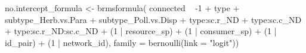 \documentclass[11pt,]{article}
\newenvironment{Shaded}{}{}
\newcommand{\KeywordTok}[1]{\textcolor[rgb]{0.00,0.00,1.00}{#1}}
\newcommand{\DataTypeTok}[1]{#1}
\newcommand{\DecValTok}[1]{#1}
\newcommand{\StringTok}[1]{\textcolor[rgb]{0.00,0.50,0.50}{#1}}
\newcommand{\OperatorTok}[1]{#1}
\newcommand{\NormalTok}[1]{#1}
\begin{document}
\begin{Shaded}
\begin{Highlighting}[]
\NormalTok{no.intercept_formula <-}\StringTok{ }\KeywordTok{brmsformula}\NormalTok{(}
\NormalTok{  connected }\OperatorTok{~}\StringTok{ }\OperatorTok{-}\DecValTok{1} \OperatorTok{+}\StringTok{ }\NormalTok{type }\OperatorTok{+}\StringTok{ }\NormalTok{subtype_Herb.vs.Para }\OperatorTok{+}\StringTok{ }\NormalTok{subtype_Poll.vs.Disp }\OperatorTok{+}\StringTok{ }
\StringTok{    }\NormalTok{type}\OperatorTok{:}\NormalTok{sc.r_ND }\OperatorTok{+}\StringTok{ }\NormalTok{type}\OperatorTok{:}\NormalTok{sc.c_ND }\OperatorTok{+}\StringTok{ }
\StringTok{    }\NormalTok{type}\OperatorTok{:}\NormalTok{sc.r_ND}\OperatorTok{:}\NormalTok{sc.c_ND }\OperatorTok{+}
\StringTok{    }\NormalTok{(}\DecValTok{1} \OperatorTok{|}\StringTok{ }\NormalTok{resource_sp) }\OperatorTok{+}\StringTok{ }\NormalTok{(}\DecValTok{1} \OperatorTok{|}\StringTok{ }\NormalTok{consumer_sp) }\OperatorTok{+}\StringTok{ }\NormalTok{(}\DecValTok{1} \OperatorTok{|}\StringTok{ }\NormalTok{id_pair) }\OperatorTok{+}\StringTok{ }\NormalTok{(}\DecValTok{1} \OperatorTok{|}\StringTok{ }\NormalTok{network_id),}
  \DataTypeTok{family =} \KeywordTok{bernoulli}\NormalTok{(}\DataTypeTok{link =} \StringTok{"logit"}\NormalTok{))}


\end{Highlighting}
\end{Shaded}
\end{document}
